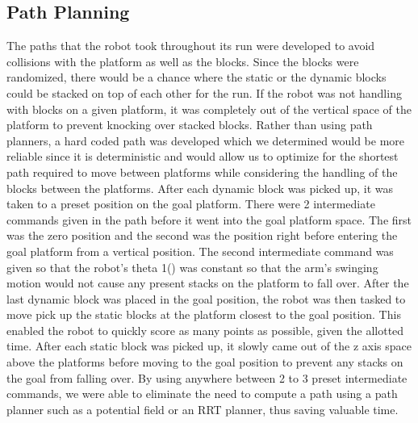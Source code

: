 \documentclass{article}
\begin{document}
    \subsection{Path Planning}
   The paths that the robot took throughout its run were developed to avoid collisions with the platform as well as the blocks. Since the blocks were randomized, there would be a chance where the static or the dynamic blocks could be stacked on top of each other for the run. If the robot was not handling with blocks on a given platform, it was completely out of the vertical space of the platform to prevent knocking over stacked blocks. Rather than using path planners, a hard coded path was developed which we determined would be more reliable since it is deterministic and would allow us to optimize for the shortest path required to move between platforms while considering the handling of the blocks between the platforms. After each dynamic block was picked up, it was taken to a preset position on the goal platform. There were 2 intermediate commands given in the path before it went into the goal platform space. The first was the zero position and the second was the position right before entering the goal platform from a vertical position. The second intermediate command was given so that the robot's theta 1() was constant so that the arm's swinging motion would not cause any present stacks on the platform to fall over. After the last dynamic block was placed in the goal position, the robot was then tasked to move pick up the static blocks at the platform closest to the goal position. This enabled the robot to quickly score as many points as possible, given the allotted time. After each static block was picked up, it slowly came out of the z axis space above the platforms before moving to the goal position to prevent any stacks on the goal from falling over. By using anywhere between 2 to 3 preset intermediate commands, we were able to eliminate the need to compute a path using a path planner such as a potential field or an RRT planner, thus saving valuable time. 
 
   

    
\end{document}
